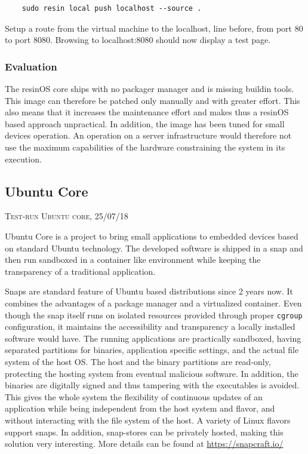 \documentclass[]{scrartcl}
\begin{document}
\begin{verbatim}
	sudo resin local push localhost --source .
\end{verbatim}

Setup a route from the virtual machine to the localhost, line before, from port 80 to port 8080. Browsing to localhost:8080 should now display a test page.

\subsubsection{Evaluation}

The resinOS core ships with no packager manager and is missing buildin tools. This image can therefore be patched only manually and with greater effort. This also means that it increases the maintenance effort and makes thus a resinOS based approach unpractical. In addition, the image has been tuned for small devices operation. An operation on a server infrastructure would therefore not use the maximum capabilities of the hardware constraining the system in its execution.

\subsection{Ubuntu Core}
{\small\textsc{Test-run Ubuntu core, 25/07/18} \bigskip}

Ubuntu Core is a project to bring small applications to embedded devices based on standard Ubuntu technology. The developed software is shipped in a snap and then run sandboxed in a container like environment while keeping the transparency of a traditional application. 

Snaps are standard feature of Ubuntu based distributions since 2 years now. It combines the advantages of a package manager and a virtualized container. Even though the snap itself runs on isolated resources provided through proper \texttt{cgroup} configuration, it maintains the accessibility and transparency a locally installed software would have. The running applications are practically sandboxed, having separated partitions for binaries, application specific settings, and the actual file system of the host OS. The host and the binary partitions are read-only, protecting the hosting system from eventual malicious software. In addition, the binaries are digitally signed and thus tampering with the executables is avoided. This gives the whole system the flexibility of continuous updates of an application while being independent from the host system and flavor, and without interacting with the file system of the host.
A variety of Linux flavors support snaps. In addition, snap-stores can be privately hosted, making this solution very interesting. More details can be found at \url{https://snapcraft.io/}
\end{document}
